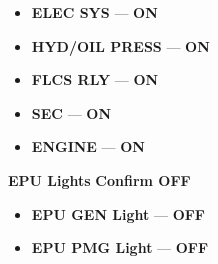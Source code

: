 \begin{checklistenumerate}
{\begin{subenumerate}
        \begin{itemize}
            \item \textbf{ELEC SYS} --- \textbf{ON}
            \item \textbf{HYD/OIL PRESS} --- \textbf{ON}
            \item \textbf{FLCS RLY} --- \textbf{ON}
            \item \textbf{SEC} --- \textbf{ON}
            \item \textbf{ENGINE} --- \textbf{ON}
        \end{itemize}
        \item \textbf{EPU Lights} \dotfill \textbf{Confirm OFF}
        \begin{itemize}
            \item \textbf{EPU GEN Light} --- \textbf{OFF}
            \item \textbf{EPU PMG Light} --- \textbf{OFF}
        \end{itemize}
    \end{subenumerate}}
\end{checklistenumerate}

\clearpage

